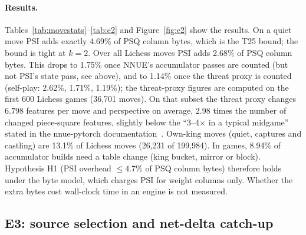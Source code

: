 \paragraph{Results.}
Tables~\ref{tab:movestats}--\ref{tab:e2} and Figure~\ref{fig:e2} show the results.
On a quiet move PSI adds exactly 4.69\% of PSQ column bytes, which is the T25 bound; the bound is tight at $k=2$.
Over all Lichess moves PSI adds 2.68\% of PSQ column bytes.
This drops to 1.75\% once NNUE's accumulator passes are counted (but not PSI's state pass, see above), and to 1.14\% once the threat proxy is counted (self-play: 2.62\%, 1.71\%, 1.19\%); the threat-proxy figures are computed on the first 600 Lichess games (36,701 moves).
On that subset the threat proxy changes 6.798 features per move and perspective on average, 2.98 times the number of changed piece-square features, slightly below the ``3--4$\times$ in a typical midgame'' stated in the nnue-pytorch documentation~\cite{nnuepytorchdocs}.
Own-king moves (quiet, captures and castling) are 13.1\% of Lichess moves (26,231 of 199,984).
In games, 8.94\% of accumulator builds need a table change (king bucket, mirror or block).
Hypothesis H1 (PSI overhead $\le4.7\%$ of PSQ column bytes) therefore holds under the byte model, which charges PSI for weight columns only.
Whether the extra bytes cost wall-clock time in an engine is not measured.

\subsection{E3: source selection and net-delta catch-up}\label{sec:e3}

